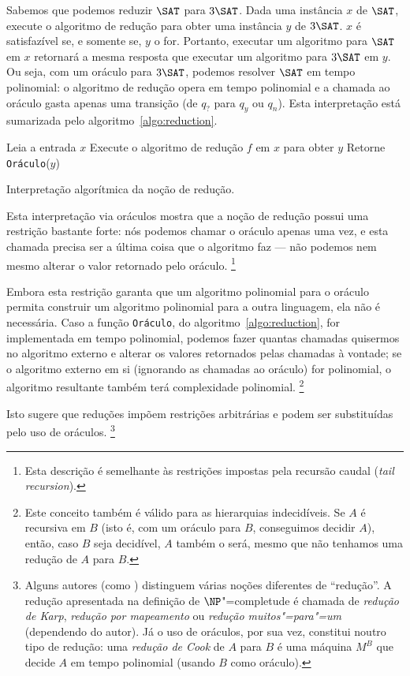 Sabemos que podemos reduzir $\SAT$ para $3\SAT$.
Dada uma instância $x$ de $\SAT$,
execute o algoritmo de redução para obter uma instância $y$ de $3\SAT$.
$x$ é satisfazível se, e somente se, $y$ o for.
Portanto, executar um algoritmo para $\SAT$ em $x$
retornará a mesma resposta
que executar um algoritmo para $3\SAT$ em $y$.
Ou seja, com um oráculo para $3\SAT$,
podemos resolver $\SAT$ em tempo polinomial:
o algoritmo de redução opera em tempo polinomial
e a chamada ao oráculo gasta apenas uma transição
(de $q_?$ para $q_y$ ou $q_n$).
Esta interpretação está sumarizada pelo algoritmo~\ref{algo:reduction}.

\begin{algorithm}[h]
    Leia a entrada $x$\;
    Execute o algoritmo de redução $f$ em $x$ para obter $y$\;
    Retorne \texttt{Oráculo}($y$)\;
    \caption{
        Interpretação algorítmica da noção de redução.
    }
    \label{algo:reduction}
\end{algorithm}

Esta interpretação via oráculos mostra que
a noção de redução possui uma restrição bastante forte:
nós podemos chamar o oráculo apenas uma vez,
e esta chamada precisa ser a última coisa que o algoritmo faz
--- não podemos nem mesmo alterar o valor retornado pelo oráculo.%
\footnote{
    Esta descrição é semelhante às restrições impostas pela recursão caudal
    (\emph{tail recursion}).
}

Embora esta restrição garanta que
um algoritmo polinomial para o oráculo
permita construir um algoritmo polinomial para a outra linguagem,
ela não é necessária.
Caso a função \texttt{Oráculo}, do algoritmo~\ref{algo:reduction},
for implementada em tempo polinomial,
podemos fazer quantas chamadas quisermos no algoritmo externo
e alterar os valores retornados pelas chamadas à vontade;
se o algoritmo externo em si
(ignorando as chamadas ao oráculo)
for polinomial,
o algoritmo resultante também terá complexidade polinomial.%
\footnote{
    Este conceito também é válido para as hierarquias indecidíveis.
    Se $A$ é recursiva em $B$
    (isto é, com um oráculo para $B$, conseguimos decidir $A$),
    então, caso $B$ seja decidível,
    $A$ também o será,
    mesmo que não tenhamos uma redução de $A$ para $B$.
}

Isto sugere que reduções impõem restrições arbitrárias
e podem ser substituídas pelo uso de oráculos.%
\footnote{
    Alguns autores (como )
    distinguem várias noções diferentes de ``redução''.
    A redução apresentada na definição de $\NP$"=completude
    é chamada de \emph{redução de Karp},
    \emph{redução por mapeamento} ou \emph{redução muitos"=para"=um}
    (dependendo do autor).
    Já o uso de oráculos, por sua vez, constitui noutro tipo de redução:
    uma \emph{redução de Cook} de $A$ para $B$
    é uma máquina $M^B$ que decide $A$ em tempo polinomial
    (usando $B$ como oráculo).
}
